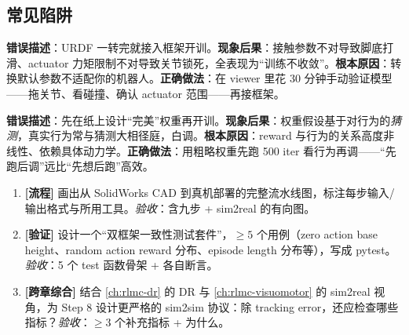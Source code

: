 \subsection{常见陷阱}
\label{sec:rlmc-diy-pipe-pitfalls}

\begin{pitfall}
\textbf{错误描述}：URDF 一转完就接入框架开训。\textbf{现象后果}：接触参数不对导致脚底打滑、actuator 力矩限制不对导致关节锁死，全表现为“训练不收敛”。\textbf{根本原因}：转换默认参数不适配你的机器人。\textbf{正确做法}：在 viewer 里花 30 分钟手动验证模型——拖关节、看碰撞、确认 actuator 范围——再接框架。
\end{pitfall}

\begin{pitfall}
\textbf{错误描述}：先在纸上设计“完美”权重再开训。\textbf{现象后果}：权重假设基于对行为的\emph{猜测}，真实行为常与猜测大相径庭，白调。\textbf{根本原因}：reward 与行为的关系高度非线性、依赖具体动力学。\textbf{正确做法}：用粗略权重先跑 500 iter 看行为再调——“先跑后调”远比“先想后跑”高效。
\end{pitfall}


\begin{practice}[端到端流水线]
\begin{enumerate}
\item \textbf{[流程]} 画出从 SolidWorks CAD 到真机部署的完整流水线图，标注每步输入/输出格式与所用工具。\emph{验收}：含九步 + sim2real 的有向图。
\item \textbf{[验证]} 设计一个“双框架一致性测试套件”，$\ge 5$ 个用例（zero action base height、random action reward 分布、episode length 分布等），写成 pytest。\emph{验收}：5 个 test 函数骨架 + 各自断言。
\item \textbf{[跨章综合]} 结合 \cref{ch:rlmc-dr} 的 DR 与 \cref{ch:rlmc-visuomotor} 的 sim2real 视角，为 Step 8 设计更严格的 sim2sim 协议：除 tracking error，还应检查哪些指标？\emph{验收}：$\ge 3$ 个补充指标 + 为什么。
\end{enumerate}
\end{practice}

